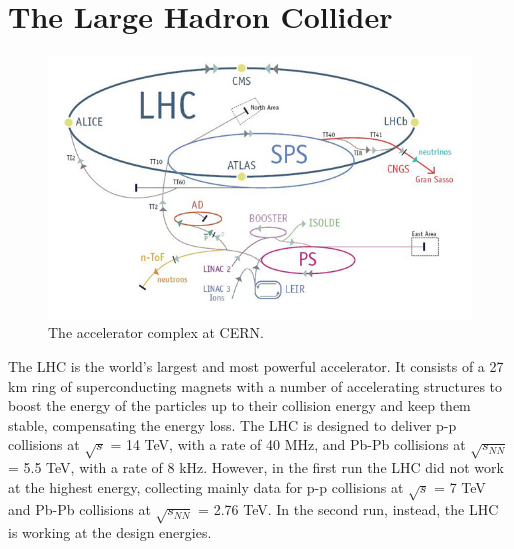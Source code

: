 \section{The Large Hadron Collider}
%
\begin{figure}
  \centering
  \includegraphics[scale=0.55]{figures/LHC.jpg}
  \caption{The accelerator complex at CERN.}
  \label{fig:LHC}
\end{figure}
%
The LHC is the world's largest and most powerful accelerator. It consists of a 27 km ring of superconducting magnets with a number of accelerating structures to boost the energy of the particles up to their collision energy and keep them stable, compensating the energy loss. The LHC is designed to deliver p-p collisions at $\sqrt{s}$ = 14 TeV, with a rate of 40 MHz, and Pb-Pb collisions at $\sqrt{s_{NN}}$ = 5.5 TeV, with a rate of 8 kHz. However, in the first run the LHC did not work at the highest energy, collecting mainly data for p-p collisions at $\sqrt{s}$ = 7 TeV and Pb-Pb collisions at $\sqrt{s_{NN}}$ = 2.76 TeV. In the second run, instead, the LHC is working at the design energies.\\
